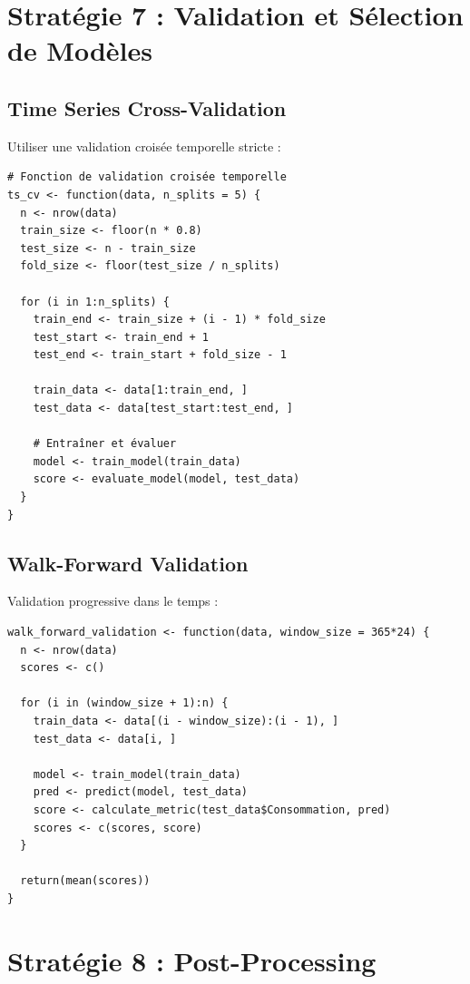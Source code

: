 \documentclass[12pt,a4paper]{article}
\begin{document}
\section{Stratégie 7 : Validation et Sélection de Modèles}

\subsection{Time Series Cross-Validation}

Utiliser une validation croisée temporelle stricte :

\begin{verbatim}
# Fonction de validation croisée temporelle
ts_cv <- function(data, n_splits = 5) {
  n <- nrow(data)
  train_size <- floor(n * 0.8)
  test_size <- n - train_size
  fold_size <- floor(test_size / n_splits)
  
  for (i in 1:n_splits) {
    train_end <- train_size + (i - 1) * fold_size
    test_start <- train_end + 1
    test_end <- train_start + fold_size - 1
    
    train_data <- data[1:train_end, ]
    test_data <- data[test_start:test_end, ]
    
    # Entraîner et évaluer
    model <- train_model(train_data)
    score <- evaluate_model(model, test_data)
  }
}
\end{verbatim}

\subsection{Walk-Forward Validation}

Validation progressive dans le temps :

\begin{verbatim}
walk_forward_validation <- function(data, window_size = 365*24) {
  n <- nrow(data)
  scores <- c()
  
  for (i in (window_size + 1):n) {
    train_data <- data[(i - window_size):(i - 1), ]
    test_data <- data[i, ]
    
    model <- train_model(train_data)
    pred <- predict(model, test_data)
    score <- calculate_metric(test_data$Consommation, pred)
    scores <- c(scores, score)
  }
  
  return(mean(scores))
}
\end{verbatim}

\section{Stratégie 8 : Post-Processing}
\end{document}
